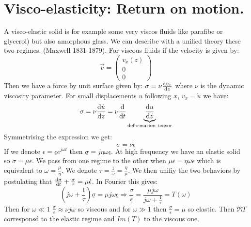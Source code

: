 \documentclass[10pt,a4paper]{book}
\begin{document}
\section{Visco-elasticity: Return on motion.}
A visco-elastic solid is for example some very viscos fluids like parafibe or glycerol) but also amorphous glass. We can describe with a unified theory these two regimes. (Maxwell 1831-1879). For viscous fluids if the velocity is given by:
\[
\vec{v} = \begin{pmatrix}
v_x(z)\\0\\0
\end{pmatrix}
\]
Then we have a force by unit surface given by: $\sigma = \nu \dv{v_x}{z}$ where $\nu$ is the dynamic viscosity parameter. For small displacements $u$ following $x$, $v_x = \dot{u}$ we have:
\[
\sigma = \nu \dv{\dot{u}}{z} = \nu \dv{}{t} \underbrace{\dv{u}{z}}_{\text{deformation tensor}}
\] 
Symmetrising the expression we get:
\[
\sigma = \nu \dot \epsilon
\]
If we denote $\epsilon = \underline{\epsilon} e^{j\omega t}$ then $\underline{\sigma} = j\eta \omega \underline{\epsilon}$. At high frequency we have an elastic solid so $\sigma = \mu \epsilon$. We pass from one regime to the other when $\mu \epsilon = \eta\omega \epsilon$ which is equivalent to $\omega = \frac{\mu}{\eta}$. We denote $\tau = \frac{1}{\omega} = \frac{\eta}{\mu}$. We then unifiy the two behaviors by postulating that $\dv{\sigma}{t} + \frac{\sigma}{\tau} = \mu \dot{\epsilon}$. In Fourier this gives:
\[
(j\omega + \frac{1}{\tau}) \underline{\sigma} = \mu j \omega \underline{\epsilon} \Rightarrow \frac{\sigma}{\underline{\epsilon}} = \frac{\mu j \omega}{j \omega + \frac{1}{\tau}} = T(\omega)
\]
Then for $\omega \ll 1$ $\frac{\sigma}{\epsilon} \approx \nu j \omega$ so viscous and for $\omega \gg 1$ then $\frac{\sigma}{\epsilon} = \mu$ so elastic. Then $\Re T$ corresponsd to the elastic regime and $Im(T)$ to the viscous one.
\end{document}
